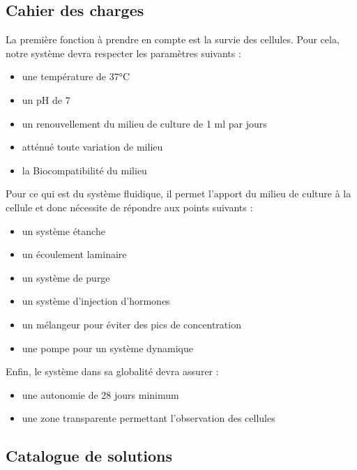 \documentclass[a4paper, 11pt]{article}
\begin{document}
\subsection{Cahier des charges}
La première fonction à prendre en compte est la survie des cellules.
Pour cela, notre système devra respecter les paramètres suivants :
\begin{itemize}
    \item une température de 37°C
    \item un pH de 7
    \item un renouvellement du milieu de culture de 1 ml par jours
    \item atténué toute variation de milieu
    \item la Biocompatibilité du milieu
\end{itemize}
Pour ce qui est du système fluidique, il permet l'apport du milieu de culture à la cellule et donc nécessite de répondre aux points suivants :
\begin{itemize}
    \item un système étanche
    \item un écoulement laminaire
    \item un système de purge
    \item un système d'injection d'hormones
    \item un mélangeur pour éviter des pics de concentration
    \item une pompe pour un système dynamique
\end{itemize}
Enfin, le système dans sa globalité devra assurer :
\begin{itemize}
    \item une autonomie de 28 jours minimum
    \item une zone transparente permettant l'observation des cellules
\end{itemize}
\subsection{Catalogue de solutions}
\end{document}
